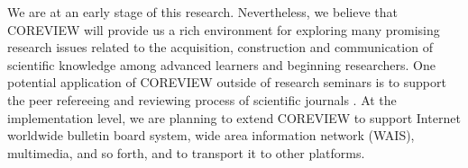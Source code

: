 We are at an early stage of this research. Nevertheless, we believe that
COREVIEW will provide us a rich environment for exploring many promising
research issues related to the acquisition, construction and communication
of scientific knowledge among advanced learners and beginning researchers.
One potential application of COREVIEW outside of research seminars is to
support the peer refereeing and reviewing process of scientific journals
\cite{Lipetz91}. At the implementation level, we are planning to extend
COREVIEW to support Internet worldwide bulletin board system, wide area
information network (WAIS), multimedia, and so forth, and to transport it
to other platforms.









